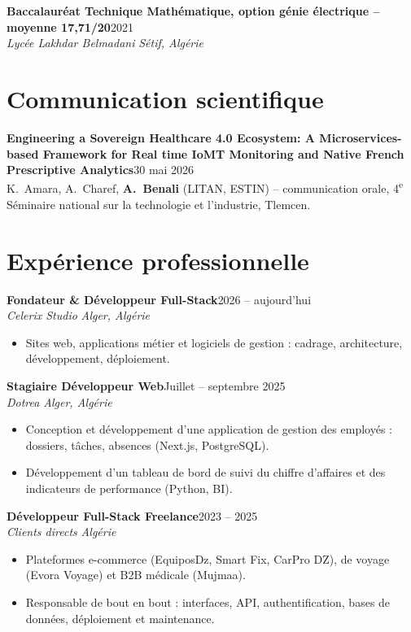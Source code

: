 \documentclass[10pt,a4paper]{article}
\newcommand{\entree}[4]{%
  \textbf{#1}\hfill{\small #2}\\
  {\itshape #3}\hfill{\small\itshape\color{muted} #4}\par}
\begin{document}
\entree{Baccalauréat Technique Mathématique, option génie électrique -- moyenne \textbf{17,71/20}}{2021}{Lycée Lakhdar Belmadani}{Sétif, Algérie}

\section{Communication scientifique}

\textbf{Engineering a Sovereign Healthcare 4.0 Ecosystem: A Microservices-based Framework for Real time IoMT Monitoring and Native French Prescriptive Analytics}\hfill{\small 30 mai 2026}\\
{\small K.~Amara, A.~Charef, \textbf{A.~Benali} (LITAN, ESTIN) -- communication orale, 4\textsuperscript{e} Séminaire national sur la technologie et l'industrie, Tlemcen.}\par

\section{Expérience professionnelle}

\entree{Fondateur \& Développeur Full-Stack}{2026 -- aujourd'hui}{Celerix Studio}{Alger, Algérie}
\begin{itemize}
  \item Sites web, applications métier et logiciels de gestion : cadrage, architecture, développement, déploiement.
\end{itemize}


\entree{Stagiaire Développeur Web}{Juillet -- septembre 2025}{Dotrea}{Alger, Algérie}
\begin{itemize}
  \item Conception et développement d'une application de gestion des employés : dossiers, tâches, absences (Next.js, PostgreSQL).
  \item Développement d'un tableau de bord de suivi du chiffre d'affaires et des indicateurs de performance (Python, BI).
\end{itemize}


\entree{Développeur Full-Stack Freelance}{2023 -- 2025}{Clients directs}{Algérie}
\begin{itemize}
  \item Plateformes e-commerce (EquiposDz, Smart Fix, CarPro DZ), de voyage (Evora Voyage) et B2B médicale (Mujmaa).
  \item Responsable de bout en bout : interfaces, API, authentification, bases de données, déploiement et maintenance.
\end{itemize}
\end{document}
